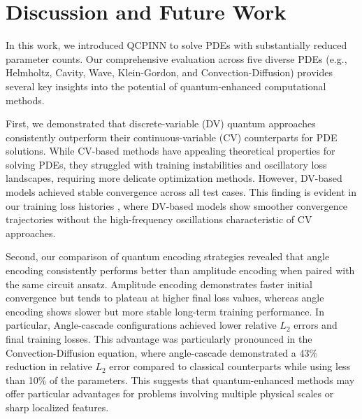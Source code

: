 \section{Discussion and Future Work} 
\label{sec:discussion}




In this work, we introduced QCPINN to solve PDEs with substantially reduced parameter counts. Our comprehensive evaluation across five diverse PDEs (e.g., Helmholtz, Cavity, Wave, Klein-Gordon, and Convection-Diffusion) provides several key insights into the potential of quantum-enhanced computational methods.

First, we demonstrated that discrete-variable (DV) quantum approaches consistently outperform their continuous-variable (CV) counterparts for PDE solutions. While CV-based methods have appealing theoretical properties for solving PDEs, they struggled with training instabilities and oscillatory loss landscapes, requiring more delicate optimization methods. However,  DV-based models achieved stable convergence across all test cases. This finding is evident in our training loss histories%
, where DV-based models show smoother convergence trajectories without the high-frequency oscillations characteristic of CV approaches.
 
Second, our comparison of quantum encoding strategies revealed that angle encoding consistently performs better than amplitude encoding when paired with the same circuit ansatz.  Amplitude encoding demonstrates faster initial convergence but tends to plateau at higher final loss values, whereas angle encoding shows slower but more stable long-term training performance.
In particular, Angle-cascade configurations achieved lower relative $L_2$ errors and final training losses. This advantage was particularly pronounced in the Convection-Diffusion equation, where angle-cascade demonstrated a 43\% reduction in relative $L_2$ error compared to classical counterparts while using less than 10\% of the parameters. This suggests that quantum-enhanced methods may offer particular advantages for problems involving multiple physical scales or sharp localized features. 

